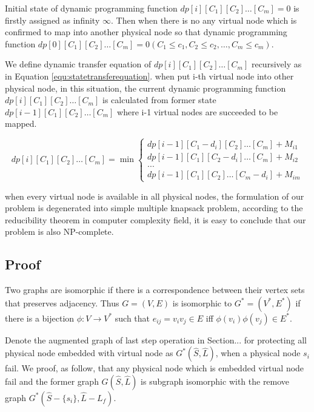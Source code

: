 Initial state of dynamic programming function $dp[i][{C_1}][{C_2}] \ldots [{C_m}]=0$ is firstly assigned as infinity $\infty$. Then when there is no any virtual node which is confirmed to map into another physical node so that dynamic programming function $dp[0][{C_1}][{C_2}] \ldots [{C_m}]=0(C_1\leq c_1,C_2\leq c_2,\ldots,C_m\leq c_m)$.

We define dynamic transfer equation of $dp[i][{C_1}][{C_2}] \ldots [{C_m}]$ recursively as in Equation \ref{equ:statetransferequation}. when put i-th virtual node into other physical node, in this situation, the current dynamic programming function $dp[i][{C_1}][{C_2}] \ldots [{C_m}]$ is calculated from former state $dp[i-1][{C_1}][{C_2}] \ldots [{C_m}]$  where i-1 virtual nodes are succeeded to be mapped.

\begin{equation}
\label{equ:statetransferequation}
dp[i][{C_1}][{C_2}] \ldots [{C_m}]=
\min \left\{ \begin{array}{l}
dp[i - 1][{C_1-d_i}][{C_2}] \ldots [{C_m}]+M_{i1}\\
dp[i - 1][{C_1}][{C_2-d_i}] \ldots [{C_m}]+M_{i2}\\
...\\
dp[i - 1][{C_1}][{C_2}] \ldots [{C_m-d_i}]+M_{im}
\end{array} \right.
\end{equation}


when every virtual node is available in all physical nodes, the formulation of our problem is degenerated into simple multiple knapsack problem, according to the reducibility theorem in computer complexity field, it is easy to conclude that our problem is also NP-complete.





\subsection{Proof}
\begin{theorem}
Two graphs are isomorphic if there is a correspondence between their vertex sets that preserves adjacency. Thus $G = (V, E)$ is isomorphic to $G^* = (V^*, E^*)$ if there is a bijection $\phi:V\rightarrow V^*$ such that $e_{ij}=v_iv_j\in E$ iff $\phi(v_i)\phi(v_j)\in E^*$.
\end{theorem}
Denote the augmented graph of last step operation in Section... for protecting all physical node embedded with virtual node as $G^*({\hat S,\hat L})$, when a physical node $s_i$ fail. We proof, as follow, that any physical node which is embedded virtual node fail and the former graph $G({\hat S,\hat L})$ is subgraph isomorphic with the remove graph $G^*\left( {\hat S  - \{ {s_i}\} ,\hat L  - {L_f}} \right)$.


